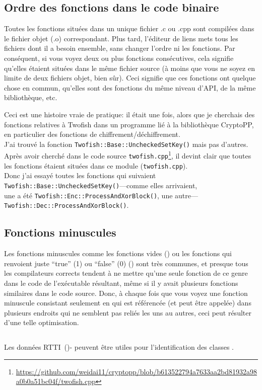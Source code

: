 \subsection{Ordre des fonctions dans le code binaire}

Toutes les fonctions situées dans un unique fichier .c ou .cpp sont compilées dans
le fichier objet (.o) correspondant.
Plus tard, l'éditeur de liens mets tous les fichiers dont il a besoin ensemble, sans
changer l'ordre ni les fonctions.
Par conséquent, si vous voyez deux ou plus fonctions consécutives, cela signifie
qu'elles étaient situées dans le même fichier source (à moins que vous ne soyez en
limite de deux fichiers objet, bien sûr).
Ceci signifie que ces fonctions ont quelque chose en commun, qu'elles sont des fonctions
du même niveau d'\ac{API}, de la même bibliothèque, etc.

Ceci est une histoire vraie de pratique: il était une fois, alors que je cherchais
des fonctions relatives à Twofish dans un programme lié à la bibliothèque CryptoPP,
en particulier des fonctions de chiffrement/déchiffrement.\\
J'ai trouvé la fonction \verb|Twofish::Base::UncheckedSetKey()| mais pas d'autres.
Après avoir cherché dans le code source
\verb|twofish.cpp|\footnote{\url{https://github.com/weidai11/cryptopp/blob/b613522794a7633aa2bd81932a98a0b0a51bc04f/twofish.cpp}},
il devint clair que toutes les fonctions étaient situées dans ce module (\verb|twofish.cpp|).\\
Donc j'ai essayé toutes les fonctions qui suivaient \verb|Twofish::Base::UncheckedSetKey()|---comme elles arrivaient,\\
une a été \verb|Twofish::Enc::ProcessAndXorBlock()|, une autre---\verb|Twofish::Dec::ProcessAndXorBlock()|.

\subsection{Fonctions minuscules}

Les fonctions minuscules comme les fonctions vides ()
ou les fonctions qui renvoient juste ``true'' (1) ou ``false'' (0) ()
sont très communes, et presque tous les compilateurs corrects tendent à ne mettre
qu'une seule fonction de ce genre dans le code de l'exécutable résultant, même si
il y avait plusieurs fonctions similaires dans le code source.
Donc, à chaque fois que vous voyez une fonction minuscule consistant seulement en
 qui est référencée (et peut être appelée) dans plusieurs endroits
qui ne semblent pas reliés les uns au autres, ceci peut résulter d'une telle optimisation.%

\subsection{\Cpp}

Les données \ac{RTTI}~()- peuvent être utiles pour l'identification des
classes \Cpp.

